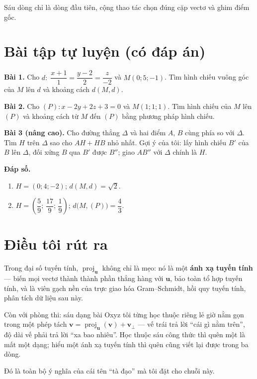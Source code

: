 \documentclass[12pt,a4paper]{article}
\begin{document}
Sáu dòng chỉ là dòng đầu tiên, cộng thao tác chọn đúng cặp vectơ và ghim điểm gốc.

\section{Bài tập tự luyện (có đáp án)}

\textbf{Bài 1.} Cho $d:\; \dfrac{x+1}{1} = \dfrac{y-2}{2} = \dfrac{z}{-2}$ và $M(0;5;-1)$. Tìm hình chiếu vuông góc của $M$ lên $d$ và khoảng cách $d(M,d)$.

\textbf{Bài 2.} Cho $(P): x - 2y + 2z + 3 = 0$ và $M(1;1;1)$. Tìm hình chiếu của $M$ lên $(P)$ và khoảng cách từ $M$ đến $(P)$ bằng phương pháp hình chiếu.

\textbf{Bài 3 (nâng cao).} Cho đường thẳng $\Delta$ và hai điểm $A$, $B$ cùng phía so với $\Delta$. Tìm $H$ trên $\Delta$ sao cho $AH+HB$ nhỏ nhất. Gợi ý của tôi: lấy hình chiếu $B'$ của $B$ lên $\Delta$, đối xứng $B$ qua $B'$ được $B''$; giao $AB''$ với $\Delta$ chính là $H$.

\textbf{Đáp số.}

\begin{enumerate}
  \item $H = (0;4;-2)$; $d(M,d) = \sqrt{2}$.
  \item $H = \left(\dfrac{5}{9};\,\dfrac{17}{9};\,\dfrac{1}{9}\right)$; $d\bigl(M,(P)\bigr) = \dfrac{4}{3}$.
\end{enumerate}

\section{Điều tôi rút ra}

Trong đại số tuyến tính, $\operatorname{proj}_{\mathbf{u}}$ không chỉ là mẹo: nó là một \textbf{ánh xạ tuyến tính} --- biến mọi vectơ thành thành phần thẳng hàng với $\mathbf{u}$, bảo toàn tổ hợp tuyến tính, và là viên gạch nền của trực giao hóa Gram--Schmidt, hồi quy tuyến tính, phân tích dữ liệu sau này.

Còn với phòng thi: sáu dạng bài Oxyz tôi từng học thuộc riêng lẻ giờ nằm gọn trong một phép tách $\mathbf{v} = \operatorname{proj}_{\mathbf{u}}(\mathbf{v}) + \mathbf{v}_{\perp}$ --- vế trái trả lời ``cái gì nằm trên'', độ dài vế phải trả lời ``xa bao nhiêu''. Học thuộc sáu công thức thì quên một là mất một dạng; hiểu một ánh xạ tuyến tính thì quên cũng viết lại được trong ba dòng.

Đó là toàn bộ ý nghĩa của cái tên ``tà đạo'' mà tôi đặt cho chuỗi này.
\end{document}
